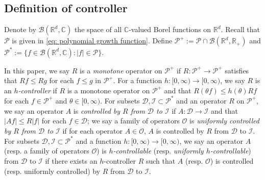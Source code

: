 \documentclass[12pt,a4paper]{amsart}
\theoremstyle{plain}
\theoremstyle{definition}
\numberwithin{equation}{section}
\begin{document}
\subsection{Definition of controller}
\label{sec: controller}
Denote by $\mathcal B(\mathbb R^d, \mathbb C)$ the space of all $\mathbb C$-valued Borel functions on $\mathbb R^d$.
Recall that $\mathcal P$ is given in \eqref{eq: polynomial growth function}.
Define $\mathcal P^+:= \mathcal P \cap \mathcal B(\mathbb R^d, \mathbb R_+)$ and $\mathcal P^*:= \{f\in \mathcal B(\mathbb R^d, \mathbb C): |f|\in \mathcal P\}$.




In this paper, we say $R$ is a \emph{monotone} operator on $\mathcal P^+$ if $R:\mathcal P^+ \to \mathcal P^+$ satisfies that $Rf\leq Rg$ for each $f\leq g$ in $\mathcal P^+$.
For a function $h: [0,\infty) \to [0,\infty)$, we say $R$ is an \emph{$h$-controller} if $R$ is a monotone operator on $\mathcal P^+$ and that $R(\theta f)\leq h(\theta) Rf$ for each $f\in \mathcal P^+$ and $\theta \in [0,\infty)$.
For subsets $\mathcal D, \mathcal I\subset \mathcal P^*$ and an operator $R$ on $\mathcal P^+$, we say an operator $A$ is \emph{controlled by $R$ from $\mathcal D$ to $\mathcal I$} if $A:\mathcal D \to \mathcal I$ and that $|Af| \leq R|f|$ for each $f\in \mathcal D$; 
we say a family of operators $\mathscr O$ is \emph{uniformly controlled by $R$ from $\mathcal D$ to $\mathcal I$} if for each operator $A\in \mathscr O$, $A$ is controlled by $R$ from $\mathcal D$ to $\mathcal I$.
For subsets $\mathcal D, \mathcal I\subset \mathcal P^*$ and a function $h:[0,\infty) \to [0,\infty)$, we say an operator $A$ (resp. a family of operators $\mathscr O$) is \emph{$h$-controllable} (resp. \emph{uniformly $h$-controllable}) from $\mathcal D$ to $\mathcal I$ if there exists an $h$-controller $R$ such that $A$ (resp. $\mathscr O$) is controlled (resp. uniformly controlled) by $R$ from $\mathcal D$ to $\mathcal I$. 
\end{document}
